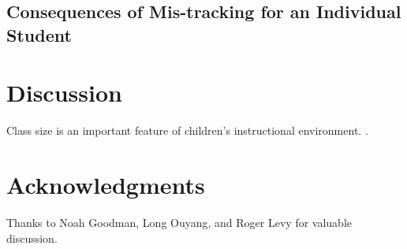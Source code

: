 \documentclass[10pt,letterpaper]{article}
\begin{document}
\subsection{Consequences of Mis-tracking for an Individual Student}





\section{Discussion}

Class size is an important feature of children's instructional environment. \cite{glass1979}.


\section{Acknowledgments}

Thanks to Noah Goodman, Long Ouyang, and Roger Levy for valuable discussion.



\setlength{\bibleftmargin}{.125in}
\setlength{\bibindent}{-\bibleftmargin}


\end{document}
